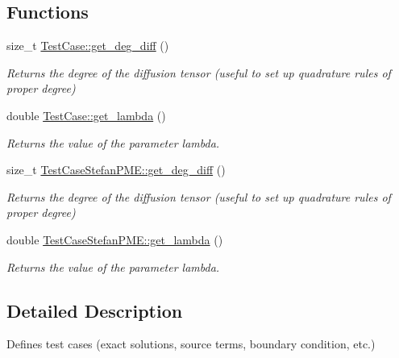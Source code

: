 \subsection*{Functions}
\begin{DoxyCompactItemize}
\item 
\mbox{\label{group__TestCases_ga3dd2daaebb012281b252ab65db0045b2}} 
size\+\_\+t \hyperlink{group__TestCases_ga3dd2daaebb012281b252ab65db0045b2}{Test\+Case\+::get\+\_\+deg\+\_\+diff} ()
\begin{DoxyCompactList}\small\item\em Returns the degree of the diffusion tensor (useful to set up quadrature rules of proper degree) \end{DoxyCompactList}\item 
\mbox{\label{group__TestCases_gabb42d3b206c5e89d34ed34f5fe2546e0}} 
double \hyperlink{group__TestCases_gabb42d3b206c5e89d34ed34f5fe2546e0}{Test\+Case\+::get\+\_\+lambda} ()
\begin{DoxyCompactList}\small\item\em Returns the value of the parameter lambda. \end{DoxyCompactList}\item 
\mbox{\label{group__TestCases_gad12abb16eefb6bbc83b2668dcfab4cee}} 
size\+\_\+t \hyperlink{group__TestCases_gad12abb16eefb6bbc83b2668dcfab4cee}{Test\+Case\+Stefan\+P\+M\+E\+::get\+\_\+deg\+\_\+diff} ()
\begin{DoxyCompactList}\small\item\em Returns the degree of the diffusion tensor (useful to set up quadrature rules of proper degree) \end{DoxyCompactList}\item 
\mbox{\label{group__TestCases_ga6a35b05916ba0fe5a3574778b597fab5}} 
double \hyperlink{group__TestCases_ga6a35b05916ba0fe5a3574778b597fab5}{Test\+Case\+Stefan\+P\+M\+E\+::get\+\_\+lambda} ()
\begin{DoxyCompactList}\small\item\em Returns the value of the parameter lambda. \end{DoxyCompactList}\end{DoxyCompactItemize}


\subsection{Detailed Description}
Defines test cases (exact solutions, source terms, boundary condition, etc.) 


